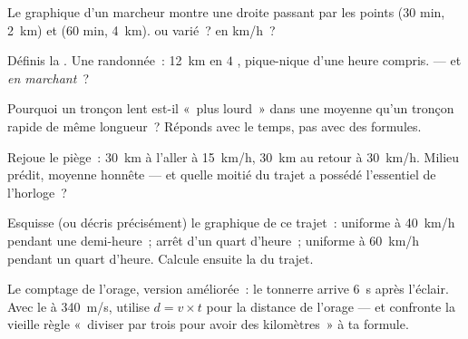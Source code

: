 \begin{exercise}[$\star$]\label{exo:g7:motion-average-speed:6}
Le graphique d'un marcheur montre une droite passant par les points
($30$ min, \qty{2}{km}) et ($60$ min, \qty{4}{km}).  ou varié~?  en \unit{km/h}~?
\end{exercise}

\begin{exercise}[$\star$]\label{exo:g7:motion-average-speed:7}
Définis la . Une randonnée~: \qty{12}{km} en $4$
, pique-nique d'une heure compris.  --- et
 \emph{en marchant}~?
\end{exercise}

\begin{exercise}[$\star\star$]\label{exo:g7:motion-average-speed:8}
Pourquoi un tronçon lent est-il «~plus lourd~» dans une moyenne qu'un
tronçon rapide de même longueur~? Réponds avec le temps, pas avec des
formules.
\end{exercise}

\begin{exercise}[$\star\star$]\label{exo:g7:motion-average-speed:9}
Rejoue le piège~: \qty{30}{km} à l'aller à \qty{15}{km/h},
\qty{30}{km} au retour à \qty{30}{km/h}. Milieu prédit, moyenne
honnête --- et quelle moitié du trajet a possédé l'essentiel de
l'horloge~?
\end{exercise}

\begin{exercise}[$\star\star$]\label{exo:g7:motion-average-speed:10}
Esquisse (ou décris précisément) le graphique de ce trajet~:
uniforme à \qty{40}{km/h} pendant une demi-heure~; arrêt d'un quart
d'heure~; uniforme à \qty{60}{km/h} pendant un quart d'heure. Calcule
ensuite la  du trajet.
\end{exercise}

\begin{exercise}[$\star\star$]\label{exo:g7:motion-average-speed:11}
Le comptage de l'orage, version améliorée~: le tonnerre arrive
\qty{6}{s} après l'éclair. Avec le  à \qty{340}{m/s}, utilise
$d = v \times t$ pour la distance de l'orage --- et confronte la
vieille règle «~diviser par trois pour avoir des kilomètres~» à ta
formule.
\end{exercise}

